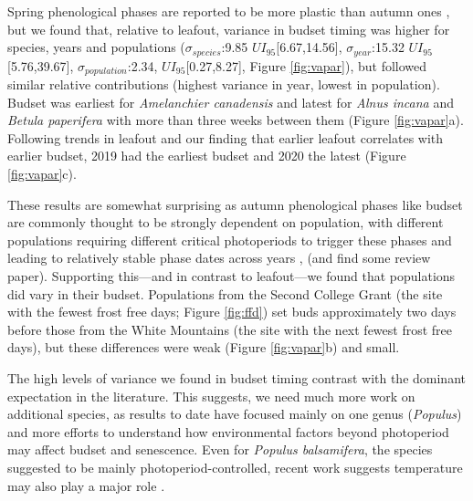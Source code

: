 \documentclass{article}[12pt]
\begin{document}
Spring phenological phases are reported to be more plastic than autumn ones \citep{mckown2014, aitken2016, vico2021}, but we found that, relative to leafout, variance in budset %
timing was higher for species, years and populations ($\sigma_{species}$:9.85 $UI_{95}$[6.67,14.56], $\sigma_{year}$:15.32 $UI_{95}$[5.76,39.67], $\sigma_{population}$:2.34, $UI_{95}$[0.27,8.27], Figure \ref{fig:vapar}), but followed similar relative contributions (highest variance in year, lowest in population). Budset was earliest for \emph{Amelanchier canadensis} and latest for \emph{Alnus incana} and \emph{Betula paperifera} with more than three weeks between them (Figure \ref{fig:vapar}a). %
Following trends in leafout and our finding that earlier leafout correlates with earlier budset, 2019 had the earliest budset and 2020 the latest (Figure \ref{fig:vapar}c).

These results are somewhat surprising as autumn phenological phases like budset %
are commonly thought to be strongly dependent on population, with different populations requiring different critical photoperiods to trigger these phases and leading to relatively stable phase dates across years \citep{soolanayakanahally2013timing}, (and find some review paper). Supporting this---and in contrast to leafout---we found that populations did vary in their budset. Populations from the Second College Grant (the site with the fewest frost free days; Figure \ref{fig:ffd}) set buds approximately two days before those from the White Mountains (the site with the next fewest frost free days), but these differences were weak (Figure \ref{fig:vapar}b) and small.


The high levels of variance we found in budset timing contrast with the dominant expectation in the literature. This suggests, we need much more work on additional species, as results to date have focused mainly on one genus (\emph{Populus}) and more efforts to understand how environmental factors beyond photoperiod may affect budset and senescence. Even for \emph{Populus balsamifera}, the species suggested to be mainly photoperiod-controlled, recent work suggests temperature may also play a major role \citep{Michelson2018}.   
\end{document}
